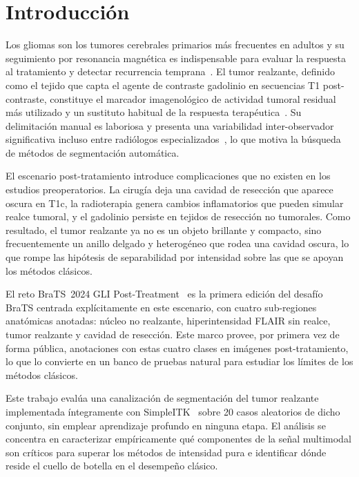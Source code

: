 \documentclass[conference]{IEEEtran}
\begin{document}
\section{Introducci\'{o}n}

Los gliomas son los tumores cerebrales primarios m\'{a}s frecuentes
en adultos y su seguimiento por resonancia magn\'{e}tica es
indispensable para evaluar la respuesta al tratamiento y detectar
recurrencia temprana~\cite{louis2021who,mesfin2024gliomas}.
El tumor realzante, definido como el tejido que capta el agente de
contraste gadolinio en secuencias T1 post-contraste, constituye
el marcador imagenol\'{o}gico de actividad tumoral residual m\'{a}s
utilizado y un sustituto habitual de la respuesta
terap\'{e}utica~\cite{bhattacharya2024posttreatment}.
Su delimitaci\'{o}n manual es laboriosa y presenta una variabilidad
inter-observador significativa incluso entre radi\'{o}logos
especializados~\cite{visser2019interobserver}, lo que motiva la
b\'{u}squeda de m\'{e}todos de segmentaci\'{o}n autom\'{a}tica.

El escenario post-tratamiento introduce complicaciones que no
existen en los estudios preoperatorios.
La cirug\'{i}a deja una cavidad de resecci\'{o}n que aparece oscura en
T1c, la radioterapia genera cambios inflamatorios que pueden
simular realce tumoral, y el gadolinio persiste en tejidos de
resecci\'{o}n no tumorales.
Como resultado, el tumor realzante ya no es un objeto brillante y
compacto, sino frecuentemente un anillo delgado y heterog\'{e}neo
que rodea una cavidad oscura, lo que rompe las hip\'{o}tesis de
separabilidad por intensidad sobre las que se apoyan los
m\'{e}todos cl\'{a}sicos.

El reto BraTS~2024 GLI Post-Treatment~\cite{deverdier2024brats}
es la primera edici\'{o}n del desaf\'{i}o BraTS centrada
expl\'{i}citamente en este escenario, con cuatro sub-regiones
anat\'{o}micas anotadas: n\'{u}cleo no realzante,
hiperintensidad FLAIR sin realce, tumor realzante y cavidad de
resecci\'{o}n.
Este marco provee, por primera vez de forma p\'{u}blica, anotaciones
con estas cuatro clases en im\'{a}genes post-tratamiento, lo que lo
convierte en un banco de pruebas natural para estudiar los
l\'{i}mites de los m\'{e}todos cl\'{a}sicos.

Este trabajo eval\'{u}a una canalizaci\'{o}n de segmentaci\'{o}n del
tumor realzante implementada \'{i}ntegramente con
SimpleITK~\cite{lloyd2010itk} sobre 20 casos aleatorios de dicho
conjunto, sin emplear aprendizaje profundo en ninguna etapa.
El an\'{a}lisis se concentra en caracterizar emp\'{i}ricamente
qu\'{e} componentes de la se\~{n}al multimodal son cr\'{i}ticos para
superar los m\'{e}todos de intensidad pura e identificar d\'{o}nde
reside el cuello de botella en el desempe\~{n}o cl\'{a}sico.
\end{document}
